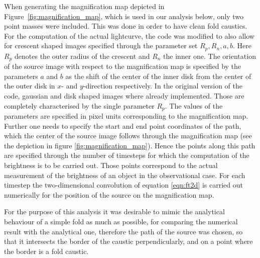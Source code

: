 \documentclass[usenatbib]{mn2e}
\begin{document}
When generating the magnification map depicted in
Figure~\ref{fig:magnification_map}, which is used in our analysis
below, only two point masses were included.  This was done in order to
have clean fold caustics.  For the computation of the actual
lightcurve, the code was modified to also allow for crescent shaped
images specified through the parameter set $R_p,R_n,a,b$. Here $R_p$
denotes the outer radius of the crescent and $R_n$ the inner one. The
orientation of the source image with respect to the magnification map
is specified by the parameters $a$ and $b$ as the shift of the center
of the inner disk from the center of the outer disk in $x$- and
$y$-direction respectively. In the original version of the code,
gaussian and disk shaped images where already implemented. Those are
completely characterised by the single parameter $R_p$. The values of
the parameters are specified in pixel units corresponding to the
magnification map. Further one needs to specify the start and end
point coordinates of the path, which the center of the source image
follows through the magnification map (see the depiction in figure
\ref{fig:magnification_map}). Hence the points along this path are
specified through the number of timesteps for which the computation of
the brightness is to be carried out. Those points correspond to the
actual measurement of the brightness of an object in the observational
case. For each timestep the two-dimensional convolution of equation
\ref{eqn:ft2d} is carried out numerically for the position of the
source on the magnification map.

For the purpose of this analysis it was desirable to mimic the
analytical behaviour of a simple fold as much as possible, for
comparing the numerical result with the analytical one, therefore the
path of the source was chosen, so that it intersects the border of the
caustic perpendicularly, and on a point where the border is a fold
caustic.
\end{document}
